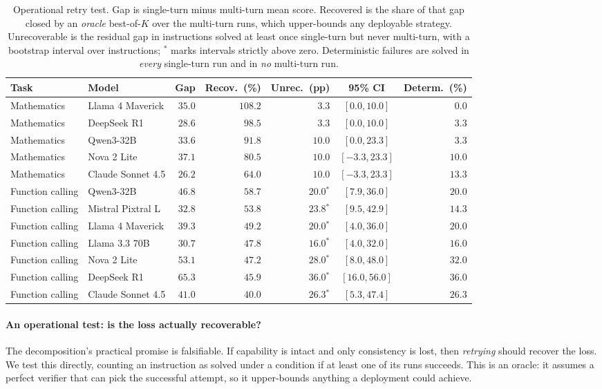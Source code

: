 \documentclass{article}
\begin{document}
\begin{table}[t]
\centering
\caption{Operational retry test. Gap is single-turn minus multi-turn mean score. Recovered is the
share of that gap closed by an \emph{oracle} best-of-$K$ over the multi-turn runs, which
upper-bounds any deployable strategy. Unrecoverable is the residual gap in instructions solved at
least once single-turn but never multi-turn, with a bootstrap interval over instructions;
$^{\ast}$ marks intervals strictly above zero. Deterministic failures are solved in \emph{every}
single-turn run and in \emph{no} multi-turn run.}
\label{tab:retry}
\small
\begin{tabular}{llrrrcr}
\toprule
Task & Model & Gap & Recov.\ (\%) & Unrec.\ (pp) & 95\% CI & Determ.\ (\%)\\
\midrule
Mathematics & Llama 4 Maverick & $35.0$ & $108.2$ & $3.3$ & $[0.0, 10.0]$ & $0.0$\\
Mathematics & DeepSeek R1 & $28.6$ & $98.5$ & $3.3$ & $[0.0, 10.0]$ & $3.3$\\
Mathematics & Qwen3-32B & $33.6$ & $91.8$ & $10.0$ & $[0.0, 23.3]$ & $3.3$\\
Mathematics & Nova 2 Lite & $37.1$ & $80.5$ & $10.0$ & $[-3.3, 23.3]$ & $10.0$\\
Mathematics & Claude Sonnet 4.5 & $26.2$ & $64.0$ & $10.0$ & $[-3.3, 23.3]$ & $13.3$\\
\midrule
Function calling & Qwen3-32B & $46.8$ & $58.7$ & $20.0$$^{\ast}$ & $[7.9, 36.0]$ & $20.0$\\
Function calling & Mistral Pixtral L & $32.8$ & $53.8$ & $23.8$$^{\ast}$ & $[9.5, 42.9]$ & $14.3$\\
Function calling & Llama 4 Maverick & $39.3$ & $49.2$ & $20.0$$^{\ast}$ & $[4.0, 36.0]$ & $20.0$\\
Function calling & Llama 3.3 70B & $30.7$ & $47.8$ & $16.0$$^{\ast}$ & $[4.0, 32.0]$ & $16.0$\\
Function calling & Nova 2 Lite & $53.1$ & $47.2$ & $28.0$$^{\ast}$ & $[8.0, 48.0]$ & $32.0$\\
Function calling & DeepSeek R1 & $65.3$ & $45.9$ & $36.0$$^{\ast}$ & $[16.0, 56.0]$ & $36.0$\\
Function calling & Claude Sonnet 4.5 & $41.0$ & $40.0$ & $26.3$$^{\ast}$ & $[5.3, 47.4]$ & $26.3$\\
\bottomrule
\end{tabular}
\end{table}

\paragraph{An operational test: is the loss actually recoverable?} The decomposition's practical
promise is falsifiable. If capability is intact and only consistency is lost, then \emph{retrying}
should recover the loss. We test this directly, counting an instruction as solved under a condition
if at least one of its runs succeeds. This is an oracle: it assumes a perfect verifier that can pick
the successful attempt, so it upper-bounds anything a deployment could achieve.
\end{document}
